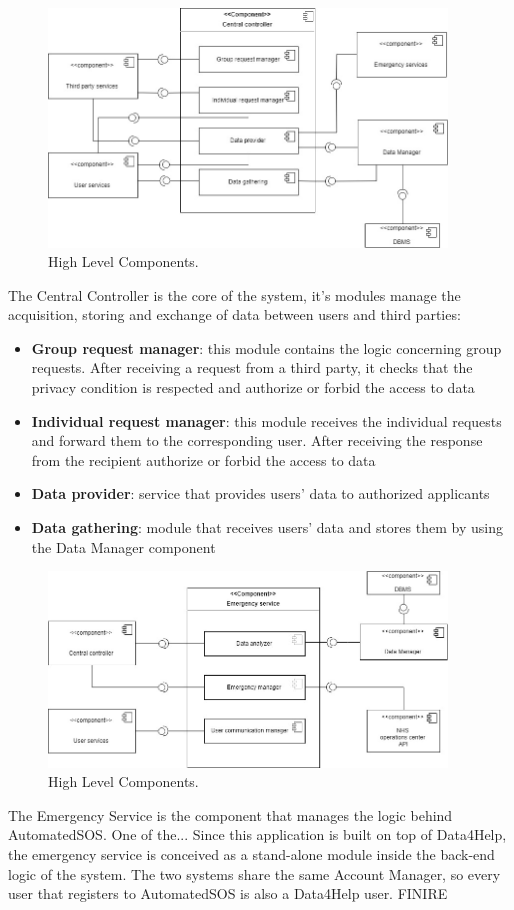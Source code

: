 \begin{figure}[ht]
    \centering
    \includegraphics[width=300pt]{images/CompView/Component_view2.jpg}
    \caption{High Level Components.}
\end{figure}
The Central Controller is the core of the system, it's modules manage the acquisition, storing and exchange of data between users and third parties:
\begin{itemize}
    \item \textbf{Group request manager}: this module contains the logic concerning group requests. After receiving a request from a third party, it checks that the privacy condition is respected and authorize or forbid the access to data 
    \item \textbf{Individual request manager}: this module receives the individual requests and forward them to the corresponding user. After receiving the response from the recipient authorize or forbid the access to data
    \item \textbf{Data provider}: service that provides users' data to authorized applicants
    \item \textbf{Data gathering}: module that receives users' data and stores them by using the Data Manager component 
\end{itemize}
\clearpage
\hypertarget{ES}{}
\begin{figure}[ht]
    \centering
    \includegraphics[width=300pt]{images/CompView/Component_view3.jpg}
    \caption{High Level Components.}
\end{figure}
The Emergency Service is the component that manages the logic behind AutomatedSOS. 
One of the...
Since this application is built on top of Data4Help, the emergency service is conceived as a stand-alone module inside the back-end logic of the system.
The two systems share the same Account Manager, so every user that registers to AutomatedSOS is also a Data4Help user. 
FINIRE

